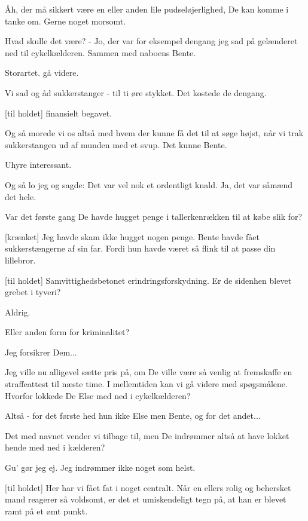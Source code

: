\documentclass[a4paper,11pt]{article}
\begin{document}
\begin{sketch}
 Åh, der må sikkert være en eller anden lile pudseløjerlighed,
De kan komme i tanke om.  Gerne noget morsomt.

 Hvad skulle det være?   - Jo, der
var for eksempel dengang jeg sad på gelænderet ned til cykelkælderen.
Sammen med naboens Bente.

 Storartet.  gå videre.

 Vi sad og åd sukkerstanger - til ti øre stykket.  Det kostede
de dengang.

[til holdet] finansielt begavet.

 Og så morede vi os altså med hvem der kunne få det til at
søge højst, når vi trak sukkerstangen ud af munden med et svup.  Det
kunne Bente.

 Uhyre interessant.

 Og så lo jeg og sagde: Det var vel nok et ordentligt knald.
Ja, det var såmænd det hele.

 Var det første gang De havde hugget penge i tallerkenrækken
til at købe slik for?

[krænket] Jeg havde skam ikke hugget nogen penge.  Bente havde
fået sukkerstængerne af sin far.  Fordi hun havde været så flink til
at passe din lillebror.

[til holdet] Samvittighedsbetonet erindringsforskydning.
 Er de sidenhen blevet grebet i tyveri?

 Aldrig.

 Eller anden form for kriminalitet?

 Jeg forsikrer Dem...

 Jeg ville nu alligevel sætte pris på, om De ville være så
venlig at fremskaffe en straffeattest til næste time.  I mellemtiden
kan vi gå videre med spøgsmålene.  Hvorfor lokkede De Else med ned i
cykelkælderen?

 Altså - for det første hed hun ikke Else men Bente, og for
det andet...

 Det med navnet vender vi tilbage til, men De indrømmer altså at have lokket hende med ned i kælderen?

 Gu' gør jeg ej.  Jeg indrømmer ikke noget som helst.

[til holdet] Her har vi fået fat i noget centralt.  Når en
ellers rolig og behersket mand reagerer så voldsomt, er det et
umiskendeligt tegn på, at han er blevet ramt på et ømt punkt.


\end{sketch}
\end{document}
